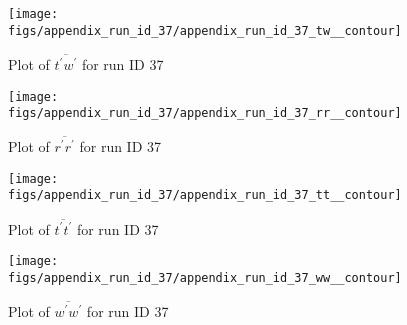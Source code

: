 \begin{figure}[H]
\centering
\texttt{[image: figs/appendix\_run\_id\_37/appendix\_run\_id\_37\_tw\_\_contour]}
\caption{Plot of $\overline{t^\prime w^\prime}$ for run ID 37}
\label{fig:appendix_run_id_37_tw__contour}
\end{figure}


\begin{figure}[H]
\centering
\texttt{[image: figs/appendix\_run\_id\_37/appendix\_run\_id\_37\_rr\_\_contour]}
\caption{Plot of $\overline{r^\prime r^\prime}$ for run ID 37}
\label{fig:appendix_run_id_37_rr__contour}
\end{figure}


\begin{figure}[H]
\centering
\texttt{[image: figs/appendix\_run\_id\_37/appendix\_run\_id\_37\_tt\_\_contour]}
\caption{Plot of $\overline{t^\prime t^\prime}$ for run ID 37}
\label{fig:appendix_run_id_37_tt__contour}
\end{figure}


\begin{figure}[H]
\centering
\texttt{[image: figs/appendix\_run\_id\_37/appendix\_run\_id\_37\_ww\_\_contour]}
\caption{Plot of $\overline{w^\prime w^\prime}$ for run ID 37}
\label{fig:appendix_run_id_37_ww__contour}
\end{figure}


